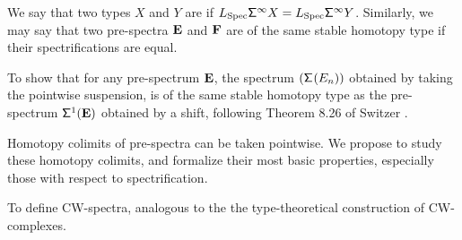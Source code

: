 \documentclass[reqno]{amsart}
\begin{document}
We say that two types $X$ and $Y$ are  if $L_{\mathrm{Spec}}{\mathsf{\Sigma}^{\infty}{X}}=L_{\mathrm{Spec}}{\mathsf{\Sigma}^{\infty}{Y}}$. Similarly, we may say that two pre-spectra $\mathbf{E}$ and $\mathbf{F}$ are of the same stable homotopy type if their spectrifications are equal.

\begin{proposal}\label{p:suspension}
To show that for any
pre-spectrum $\mathbf{E}$, the spectrum $(\mathsf{\Sigma}^{}(E_n))$ obtained by taking the pointwise suspension,
is of the same stable homotopy type as the pre-spectrum $\mathsf{\Sigma}^{1}(\mathbf{E})$ obtained by a shift, following Theorem 8.26 of Switzer \cite{Switzer02}.
\end{proposal}

\begin{proposal}\label{p:colimits_spectra}
Homotopy colimits of pre-spectra can be taken pointwise. We propose to study
these homotopy colimits, and formalize their most basic properties, especially
those with respect to spectrification. 
\end{proposal}

\begin{proposal}\label{p:cw_spectra}
To define CW-spectra, analogous to the the type-theoretical construction of
CW-complexes.
\end{proposal}

\begin{comment}
As a final remark before we move on to stable homotopy groups and homotopy
groups of spectra, we suggest how constructions of CW-complexes can be mimicked
in the case of (pre-)spectra. 
(Pre-)spectra can be parametrized over an arbitrary type. More precisely, given a base type
$B$, an \define{parametrized (pre-)spectrum} is simply a map
\begin{equation*}
B\to\mathrm{(pre)Spec}
\end{equation*}
into the type of all (pre-)spectra. A \define{$k$-sphere-spectrum bundle} over $B$ is
an parametrized spectrum which lands in the connected component of $\suspspec(\sphere{k})$. 
Suppose we have a $k$-sphere-spectrum bundle $\spectrum{E}$ over $B$, and for each $b:B$
a morphism $f(b):\spectrum{E}(b)\to \spectrum{F}$ of pre-spectra. 
Then we obtain a pre-spectrum $\spectrum{G}$ by \define{attaching} the $B$-parametrized $(k+1)$-cells to $\spectrum{F}$,
by taking for each $n:\Z$ the pushout
\begin{equation*}
\begin{tikzcd}[column sep=7em]
\sm{b:B}E_n(b) \arrow[r,"\lam{b}{x}f(b)_n(x)"] \arrow[d,"\proj 1"] & F_n \arrow[d] \\
B \arrow[r] & G_n
\end{tikzcd}
\end{equation*}
The structure maps are induced by the structure maps for $\spectrum{E}$ and $\spectrum{F}$.
\end{comment}
\end{document}
